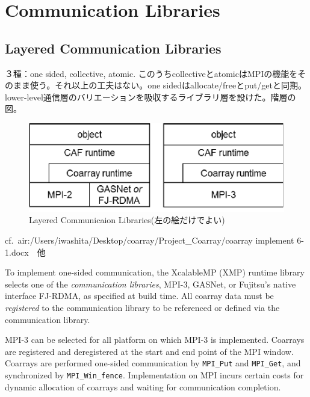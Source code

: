 \section{Communication Libraries}\label{sec:runtime}

\subsection{Layered Communication Libraries}

３種：one sided, collective, atomic. このうちcollectiveとatomicはMPIの機能をそのまま使う。それ以上の工夫はない。one sidedはallocate/freeとput/getと同期。lower-level通信層のバリエーションを吸収するライブラリ層を設けた。階層の図。

\begin{figure}[tbh]
  \begin{center}
  \includegraphics[scale=1.0]{figs/layer.pdf}
  \caption{Layered Communicaion Libraries(左の絵だけでよい)}\label{fig:layer}
  \end{center}
\end{figure}

cf.\ air:/Users/iwashita/Desktop/coarray/Project\_Coarray/coarray implement 6-1.docx　他


To implement one-sided communication, the XcalableMP (XMP) runtime library selects one of the 
{\em communication libraries}, MPI-3, GASNet, or Fujitsu’s native interface FJ-RDMA, 
as specified at build time. All coarray data must be {\em registered} to the communication 
library to be referenced or defined via the communication library.

MPI-3 can be selected for all platform on which MPI-3 is implemented. Coarrays are 
registered and deregistered at the start and end point of the MPI window. 
Coarrays are performed one-sided communication by {\tt MPI\_Put} and {\tt MPI\_Get}, 
and synchronized by {\tt MPI\_Win\_fence}. 
Implementation on MPI incurs certain costs for dynamic allocation of coarrays and 
waiting for communication completion.

